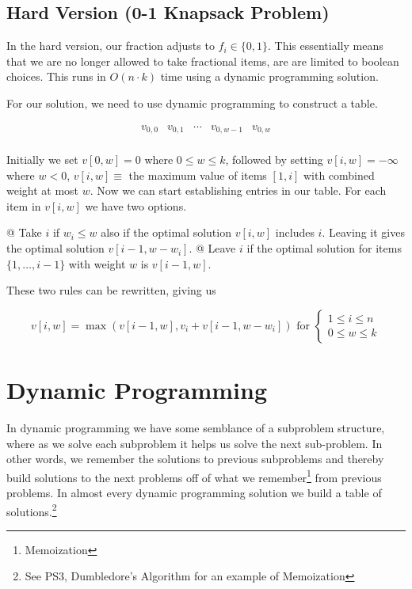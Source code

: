 \documentclass[10pt]{article}
\begin{document}
    \subsection{Hard Version (0-1 Knapsack Problem)}
    In the hard version, our fraction adjusts to $f_i \in \{0, 1\}$. This essentially means that we are no longer
    allowed to take fractional items, are are limited to boolean choices. This runs in $O(n \cdot k)$ time using a
    dynamic programming solution.

    For our solution, we need to use dynamic programming to construct a table. %

    \[
        \begin{array}{ccccc}
            v_{0,0} & v_{0,1} & \cdots & v_{0,w-1} & v_{0,w}\\
        \end{array}
    \]

    Initially we set $v[0,w] = 0$ where $0 \le w \le k$, followed by setting $v[i,w]= - \infty$ where $w < 0$, $v[i, w]
    \equiv$ the maximum value of items $[1,i]$ with combined weight at most $w$. Now we can start establishing entries
    in our table. For each item in $v[i,w]$ we have two options.

        \NewList
        \begin{easylist}
            @ Take $i$ if $w_i \le w$ also if the optimal solution $v[i,w]$ includes $i$. Leaving it gives the optimal
            solution $v[i-1, w - w_i]$.
            @ Leave $i$ if the optimal solution for items $\{1, \ldots, i-1\}$ with weight $w$ is $v[i-1,w]$.
        \end{easylist}

    These two rules can be rewritten, giving us

        \[
            v[i,w] = \max(v[i - 1,w], v_i + v[i - 1, w - w_i])
            \text{ for } \begin{cases}1 \le i \le n\\0 \le w \le k\end{cases}
        \]

\section{Dynamic Programming}
In dynamic programming we have some semblance of a subproblem structure, where as we solve each subproblem it helps us
solve the next sub-problem. In other words, we remember the solutions to previous subproblems and thereby build
solutions to the next problems off of what we remember\footnote{Memoization} from previous problems. In almost every
dynamic programming solution we build a table of solutions.\footnote{See PS3, Dumbledore's Algorithm for an example of
Memoization}
\end{document}
